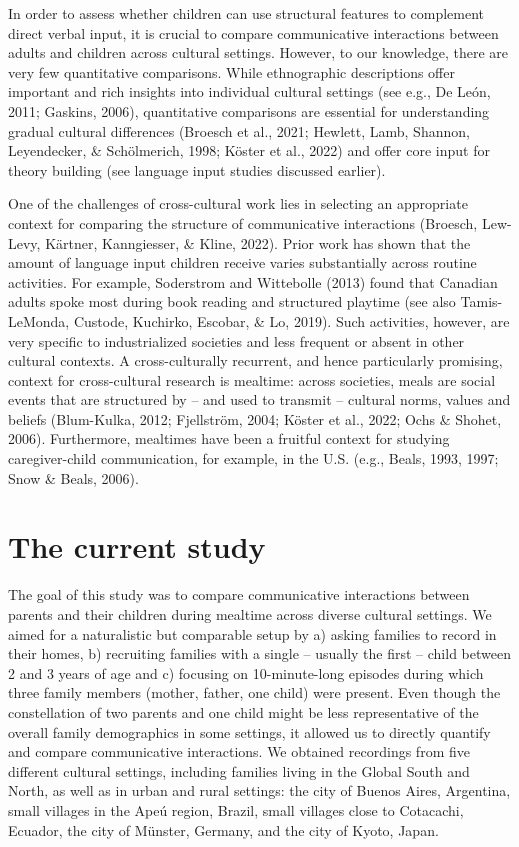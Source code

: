 \documentclass[
  man,floatsintext]{apa6}
\begin{document}
In order to assess whether children can use structural features to complement direct verbal input, it is crucial to compare communicative interactions between adults and children across cultural settings. However, to our knowledge, there are very few quantitative comparisons. While ethnographic descriptions offer important and rich insights into individual cultural settings (see e.g., De León, 2011; Gaskins, 2006), quantitative comparisons are essential for understanding gradual cultural differences (Broesch et al., 2021; Hewlett, Lamb, Shannon, Leyendecker, \& Schölmerich, 1998; Köster et al., 2022) and offer core input for theory building (see language input studies discussed earlier).

One of the challenges of cross-cultural work lies in selecting an appropriate context for comparing the structure of communicative interactions (Broesch, Lew-Levy, Kärtner, Kanngiesser, \& Kline, 2022). Prior work has shown that the amount of language input children receive varies substantially across routine activities. For example, Soderstrom and Wittebolle (2013) found that Canadian adults spoke most during book reading and structured playtime (see also Tamis-LeMonda, Custode, Kuchirko, Escobar, \& Lo, 2019). Such activities, however, are very specific to industrialized societies and less frequent or absent in other cultural contexts. A cross-culturally recurrent, and hence particularly promising, context for cross-cultural research is mealtime: across societies, meals are social events that are structured by -- and used to transmit -- cultural norms, values and beliefs (Blum-Kulka, 2012; Fjellström, 2004; Köster et al., 2022; Ochs \& Shohet, 2006). Furthermore, mealtimes have been a fruitful context for studying caregiver-child communication, for example, in the U.S. (e.g., Beals, 1993, 1997; Snow \& Beals, 2006).

\hypertarget{the-current-study}{%
\section{The current study}\label{the-current-study}}

The goal of this study was to compare communicative interactions between parents and their children during mealtime across diverse cultural settings. We aimed for a naturalistic but comparable setup by a) asking families to record in their homes, b) recruiting families with a single -- usually the first -- child between 2 and 3 years of age and c) focusing on 10-minute-long episodes during which three family members (mother, father, one child) were present. Even though the constellation of two parents and one child might be less representative of the overall family demographics in some settings, it allowed us to directly quantify and compare communicative interactions. We obtained recordings from five different cultural settings, including families living in the Global South and North, as well as in urban and rural settings: the city of Buenos Aires, Argentina, small villages in the Apeú region, Brazil, small villages close to Cotacachi, Ecuador, the city of Münster, Germany, and the city of Kyoto, Japan.
\end{document}
